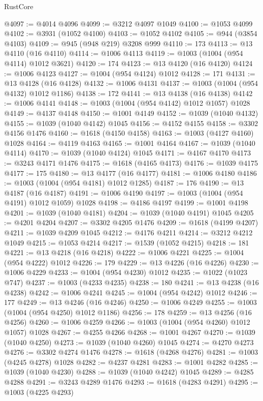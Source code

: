 \begin{lexlean}{RustCore}
\begin{coremodule}
@4097 := @4014 @4096
@4099 := @3212 @4097 @1049
@4100 := @1053 @4099
@4102 := @3931 (@1052 @4100)
@4103 := @1052 @4102
@4105 := @944 (@3854 @4103)
@4109 := @945 (@948 @219) @3208 @999
@4110 := 173
@4113 := @13 @4110 (@16 @4110)
@4114 := @1006 @4113
@4119 := @1003 (@1004 (@954 @4114) @1012 @3621)
@4120 := 174
@4123 := @13 @4120 (@16 @4120)
@4124 := @1006 @4123
@4127 := @1004 (@954 @4124) @1012
@4128 := 171
@4131 := @13 @4128 (@16 @4128)
@4132 := @1006 @4131
@4137 := @1003 (@1004 (@954 @4132) @1012 @1186)
@4138 := 172
@4141 := @13 @4138 (@16 @4138)
@4142 := @1006 @4141
@4148 := @1003 (@1004 (@954 @4142) @1012 @1057) @1028
@4149 := @4137 @4148
@4150 := @1001 @4149
@4152 := @1039 (@1040 @4132)
@4155 := @1039 (@1040 @4142) @1045
@4156 := @4152 @4155
@4158 := @3302 @4156 @1476
@4160 := @1618 (@4150 @4158)
@4163 := @1003 (@4127 @4160) @1028
@4164 := @4119 @4163
@4165 := @1001 @4164
@4167 := @1039 (@1040 @4114)
@4170 := @1039 (@1040 @4124) @1045
@4171 := @4167 @4170
@4173 := @3243 @4171 @1476
@4175 := @1618 (@4165 @4173)
@4176 := @1039 @4175
@4177 := 175
@4180 := @13 @4177 (@16 @4177)
@4181 := @1006 @4180
@4186 := @1003 (@1004 (@954 @4181) @1012 @1285)
@4187 := 176
@4190 := @13 @4187 (@16 @4187)
@4191 := @1006 @4190
@4197 := @1003 (@1004 (@954 @4191) @1012 @1059) @1028
@4198 := @4186 @4197
@4199 := @1001 @4198
@4201 := @1039 (@1040 @4181)
@4204 := @1039 (@1040 @4191) @1045
@4205 := @4201 @4204
@4207 := @3302 @4205 @1476
@4209 := @1618 (@4199 @4207)
@4211 := @1039 @4209 @1045
@4212 := @4176 @4211
@4214 := @3212 @4212 @1049
@4215 := @1053 @4214
@4217 := @1539 (@1052 @4215)
@4218 := 181
@4221 := @13 @4218 (@16 @4218)
@4222 := @1006 @4221
@4225 := @1004 (@954 @4222) @1012
@4226 := 179
@4229 := @13 @4226 (@16 @4226)
@4230 := @1006 @4229
@4233 := @1004 (@954 @4230) @1012
@4235 := @1022 (@1023 @747)
@4237 := @1003 (@4233 @4235)
@4238 := 180
@4241 := @13 @4238 (@16 @4238)
@4242 := @1006 @4241
@4245 := @1004 (@954 @4242) @1012
@4246 := 177
@4249 := @13 @4246 (@16 @4246)
@4250 := @1006 @4249
@4255 := @1003 (@1004 (@954 @4250) @1012 @1186)
@4256 := 178
@4259 := @13 @4256 (@16 @4256)
@4260 := @1006 @4259
@4266 := @1003 (@1004 (@954 @4260) @1012 @1057) @1028
@4267 := @4255 @4266
@4268 := @1001 @4267
@4270 := @1039 (@1040 @4250)
@4273 := @1039 (@1040 @4260) @1045
@4274 := @4270 @4273
@4276 := @3302 @4274 @1476
@4278 := @1618 (@4268 @4276)
@4281 := @1003 (@4245 @4278) @1028
@4282 := @4237 @4281
@4283 := @1001 @4282
@4285 := @1039 (@1040 @4230)
@4288 := @1039 (@1040 @4242) @1045
@4289 := @4285 @4288
@4291 := @3243 @4289 @1476
@4293 := @1618 (@4283 @4291)
@4295 := @1003 (@4225 @4293)

\end{coremodule}
\end{lexlean}
